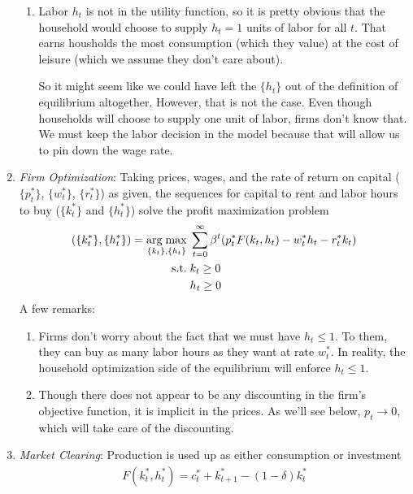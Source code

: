 \documentclass[12pt]{article}
\theoremstyle{plain}
\theoremstyle{definition}
\theoremstyle{remark}
\newcommand{\ra}{\rightarrow}
\DeclareMathOperator*{\argmax}{arg\;max}
\newcommand{\sumtinfz}{\sum^\infty_{t=0}}
\begin{document}
\begin{enumerate}
\begin{enumerate}
      \item Labor $h_t$ is not in the utility function, so it is pretty
        obvious that the household would choose to supply $h_t=1$ units
        of labor for all $t$. That earns housholds the most consumption
        (which they value) at the cost of leisure (which we assume they
        don't care about).

        So it might seem like we could have left the $\{h_t\}$ out of
        the definition of equilibrium altogether. However, that is not
        the case. Even though households will choose to supply one unit
        of labor, firms don't know that. We must keep the labor decision
        in the model because that will allow us to pin down the wage
        rate.
    \end{enumerate}

  \item \emph{Firm Optimization}: Taking
    prices, wages, and the rate of return on capital
    ($\{p^*_t\}$, $\{w^*_t\}$, $\{r^*_t\}$) as given,
    the sequences for capital to rent and labor hours to buy
    ($\{k_t^*\}$ and $\{h_t^*\}$)
    solve the profit maximization problem
    \begin{align}
      (\{k_t^*\}, \{h_t^*\})
      =
      \argmax_{\{k_t\}, \{h_t\}}
        \; &\sumtinfz \beta^t (p^*_t F(k_t,h_t) - w^*_t h_t - r^*_t k_t)
        \label{defn:adce-firm-objfcn}\\
      \text{s.t.} \;
      &k_t \geq 0 \notag\\
      &h_t \geq 0 \notag
    \end{align}
    A few remarks:
    \begin{enumerate}
      \item Firms don't worry about the fact that we must have
        $h_t\leq 1$. To them, they can buy as many labor hours as they
        want at rate $w^*_t$. In reality, the household optimization
        side of the equilibrium will enforce $h_t\leq 1$.

      \item Though there does not appear to be any discounting in the
        firm's objective function, it is implicit in the prices. As
        we'll see below, $p_t\ra 0$, which will take care of the
        discounting.
    \end{enumerate}

  \item \emph{Market Clearing}: Production is used up as either
    consumption or investment
    \begin{align*}
      F(k^*_t,h_t^*) = c_t^* + k_{t+1}^* - (1-\delta) k_t^*
    \end{align*}
\end{enumerate}
\end{document}
